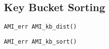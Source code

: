 



\subsection{Key Bucket Sorting}


\tobeextended

\begin{verbatim}
AMI_err AMI_kb_dist()
\end{verbatim}

\begin{verbatim}
AMI_err AMI_kb_sort()
\end{verbatim}

